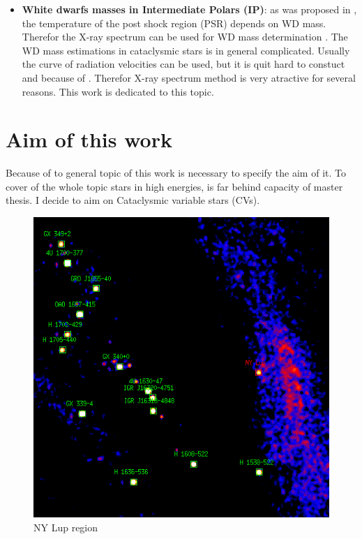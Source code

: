 \documentclass[oneside,a4paper,11pt]{report}
\begin{document}
\begin{itemize}
 \item \textbf{White dwarfs masses in Intermediate Polars (IP)}: as was proposed in \citet{1981ApJ...250..723R}, 
the temperature of the post shock region (PSR) depends on WD mass. Therefor the X-ray spectrum can be 
used for WD mass determination \citet{2005A&A...435..191S}. The WD mass estimations in cataclysmic stars 
is in general complicated. Usually the curve of radiation velocities can be used, but it is quit hard to constuct and
because of . 
Therefor X-ray spectrum method is very atractive for several reasons. This work is dedicated to this topic.  

\end{itemize}

\section{Aim of this work}
Because of to general topic of this work is necessary to specify the aim of it. To cover of the whole 
topic stars in high energies, is far behind capacity of master thesis.  I decide to aim on Cataclysmic 
variable stars (CVs).  

\begin{figure}[!hbt]
\centering
\includegraphics[totalheight=11cm]{plot/ds9_3}
\caption{NY Lup region }
\label{nylup1} 
\end{figure}
\end{document}
